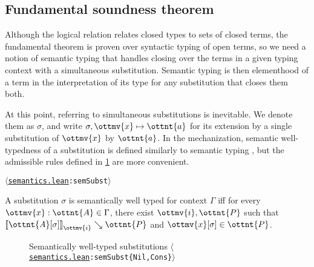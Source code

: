 \documentclass[a4paper,UKenglish,cleveref,autoref,thm-restate]{lipics-v2021}
\newcommand{\repo}{https://github.com/ionathanch/TTBFL}
\newcommand{\thmref}[2]{%
  $\langle$\href{\repo/tree/main/src/#1}{\texttt{#1}}\texttt{:#2}$\rangle$%
}
\begin{document}
\subsection{Fundamental soundness theorem}

Although the logical relation relates closed types to sets of closed terms,
the fundamental theorem is proven over syntactic typing of open terms,
so we need a notion of semantic typing that handles closing over the terms
in a given typing context with a simultaneous substitution.
Semantic typing is then elementhood of a term in the interpretation of its type
for any substitution that closes them both.

At this point, referring to simultaneous substitutions is inevitable.
We denote them as $\sigma$, and write $ \sigma ,  \ottmv{x}  \mapsto  \ottnt{a} $
for its extension by a single substitution of $\ottmv{x}$ by $\ottnt{a}$.
In the mechanization, semantic well-typedness of a substitution \fbox{$ \sigma  \vDash  \Gamma $}
is defined similarly to semantic typing ,
but the admissible rules defined in \cref{fig:sem:subst} are more convenient.

\begin{definition} \thmref{semantics.lean}{semSubst}
  A substitution $\sigma$ is semantically well typed
  for context $\Gamma$ iff for every $ \ottmv{x}  \mathrel{:}  \ottnt{A}  \in  \Gamma $,
  there exist $\ottmv{i}, \ottnt{P}$ such that
  $ \mathopen{\llbracket}   \ottnt{A} [  \sigma  ]   \mathclose{\rrbracket}_{ \ottmv{i} } \searrow  \ottnt{P} $ and $  \ottmv{x} [  \sigma  ]   \in  \ottnt{P} $.
\end{definition}

\begin{figure}
\caption{Semantically well-typed substitutions \thmref{semantics.lean}{semSubst\{Nil,Cons\}}}
\label{fig:sem:subst}
\end{figure}
\end{document}
